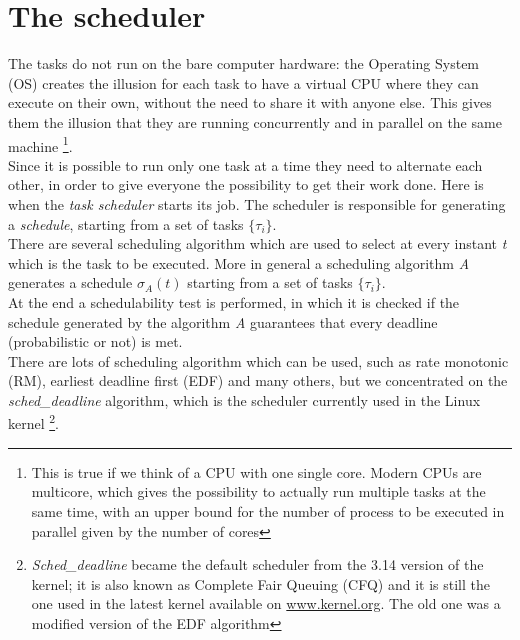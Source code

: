 \section{The scheduler}
The tasks do not run on the bare computer hardware: the Operating System (OS) creates the illusion for each task to have a virtual CPU where they can execute on their own, without the need to share it with anyone else. This gives them the illusion that they are running concurrently and in parallel on the same machine \footnote{This is true if we think of a CPU with one single core. Modern CPUs are multicore, which gives the possibility to actually run multiple tasks at the same time, with an upper bound for the number of process to be executed in parallel given by the number of cores}.\\
Since it is possible to run only one task at a time they need to alternate each other, in order to give everyone the possibility to get their work done. Here is when the \emph{task scheduler} starts its job. The scheduler is responsible for generating a \emph{schedule}, starting from a set of tasks \( \{\tau_{i}\} \).\\
There are several scheduling algorithm which are used to select at every instant \emph{t} which is the task to be executed. More in general a scheduling algorithm \emph{A} generates a schedule \( \sigma_{A}\left(t\right) \) starting from a set of tasks \( \{\tau_{i}\} \).\\
At the end a schedulability test is performed, in which it is checked if the schedule generated by the algorithm \emph{A} guarantees that every deadline (probabilistic or not) is met.\\
There are lots of scheduling algorithm which can be used, such as rate monotonic (RM), earliest deadline first (EDF) and many others, but we concentrated on the \emph{sched\_deadline} algorithm, which is the scheduler currently used in the Linux kernel \footnote{\emph{Sched\_deadline} became the default scheduler from the 3.14 version of the kernel; it is also known as Complete Fair Queuing (CFQ) and it is still the one used in the latest kernel available on \url{www.kernel.org}. The old one was a modified version of the EDF algorithm}.

